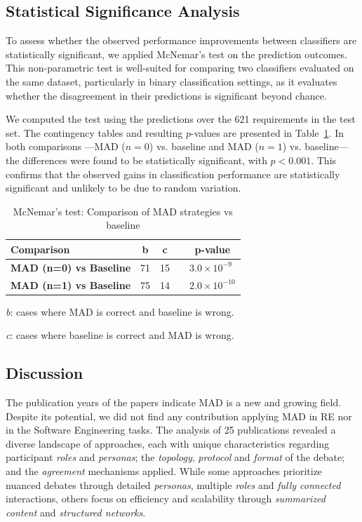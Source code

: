 \documentclass[conference]{IEEEtran}
\begin{document}
\subsection*{Statistical Significance Analysis}
To assess whether the observed performance improvements between classifiers are statistically significant, we applied McNemar’s test on the prediction outcomes. This non-parametric test is well-suited for comparing two classifiers evaluated on the same dataset, particularly in binary classification settings, as it evaluates whether the disagreement in their predictions is significant beyond chance.

We computed the test using the predictions over the 621 requirements in the test set. The contingency tables and resulting $p$-values are presented in Table~\ref{tab:mcnemar}. In both comparisons ---MAD ($n=0$) vs. baseline and MAD ($n=1$) vs. baseline--- the differences were found to be statistically significant, with $p < 0.001$. This confirms that the observed gains in classification performance are statistically significant and unlikely to be due to random variation.

\begin{table}[h]
\caption{McNemar’s test: Comparison of MAD strategies vs baseline}
\label{tab:mcnemar}
\centering
\begin{tabularx}
{\linewidth}{@{}Xcccc@{}}
\toprule
\textbf{Comparison} & \textbf{b} & \textbf{c} &  &\textbf{p-value} \\
\midrule
\textbf{MAD (n=0) vs Baseline} & 71 & 15 &  &\multicolumn{1}{l}{$3.0 \times 10^{-9}$} \\
\textbf{MAD (n=1) vs Baseline} & 75 & 14 & &\multicolumn{1}{l}{$2.0 \times 10^{-10}$} \\
\bottomrule
\end{tabularx}
\vspace{1mm}

\footnotesize
\centerline{\textit{b}: cases where MAD is correct and baseline is wrong.}
\centerline{\textit{c}: cases where baseline is correct and MAD is wrong.}
\end{table}


\subsection{Discussion}
The publication years of the papers indicate MAD is a new and growing field. Despite its potential, we did not find any contribution applying MAD in RE nor in the Software Engineering tasks. The analysis of 25 publications revealed a diverse landscape of approaches, each with unique characteristics regarding participant \textit{roles} and \textit{personas}; the \textit{topology}, \textit{protocol} and \textit{format} of the debate; and the \textit{agreement} mechanisms applied. While some approaches prioritize nuanced debates through detailed \textit{personas}, multiple \textit{roles} and \textit{fully connected} interactions, others focus on efficiency and scalability through \textit{summarized content} and \textit{structured networks}. 
\end{document}
